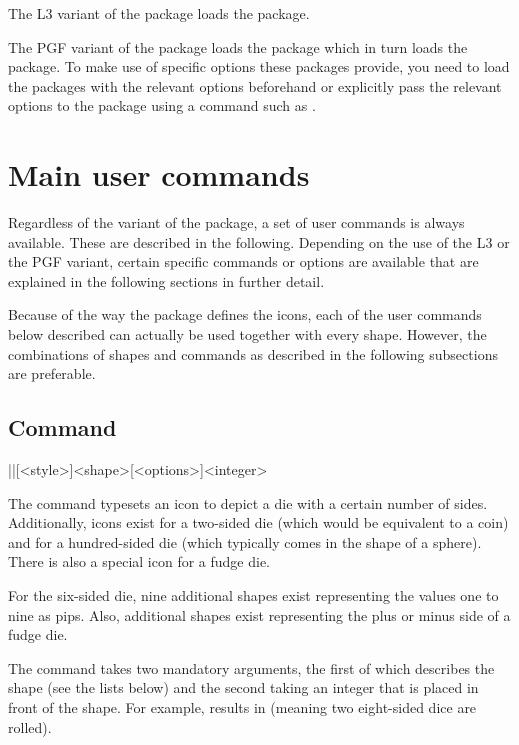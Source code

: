 \documentclass[a4paper]{article}
\begin{document}
The L3 variant of the package loads the  package.

The PGF variant of the package loads the  package which in turn loads the  package. To make use of specific options these packages provide, you need to load the packages with the relevant options beforehand or explicitly pass the relevant options to the package using a command such as .

\section{Main user commands}

Regardless of the variant of the package, a set of user commands is always available. These are described in the following. Depending on the use of the L3 or the PGF variant, certain specific commands or options are available that are explained in the following sections in further detail.

Because of the way the package defines the icons, each of the user commands below described can actually be used together with every shape. However, the combinations of shapes and commands as described in the following subsections are preferable.

\subsection[Command \textbackslash die]{Command }

\begin{macrodef}
|\die|[<style>]{<shape>}[<options>]{<integer>}
\end{macrodef}
The command \macro{\die} typesets an icon to depict a die with a certain number of sides. Additionally, icons exist for a two-sided die (which would be equivalent to a coin) and for a hundred-sided die (which typically comes in the shape of a sphere). There is also a special icon for a fudge die.

For the six-sided die, nine additional shapes exist representing the values one to nine as pips. Also, additional shapes exist representing the plus or minus side of a fudge die.

The command takes two mandatory arguments, the first of which describes the shape (see the lists below) and the second taking an integer that is placed in front of the shape. For example,  results in  (meaning two eight-sided dice are rolled).
\end{document}
